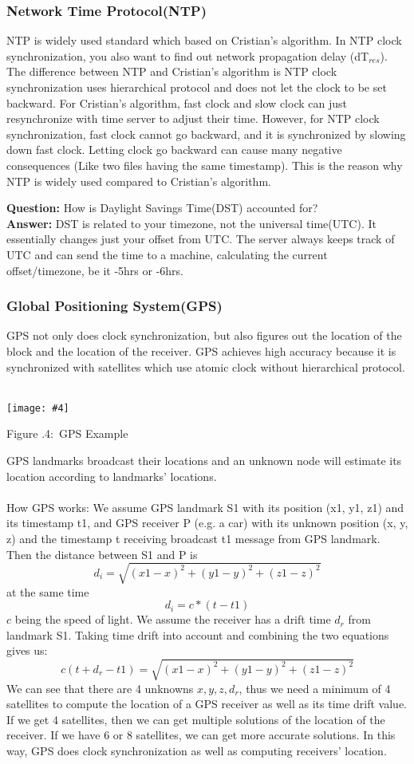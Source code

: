 \documentclass[twoside]{article}
\newcounter{lecnum}
\newcommand{\fig}[4]{
            \centerline{\texttt{[image: \#4]}}
            \begin{center}
            Figure \thelecnum.#1:~#3
            \end{center}
    }
\begin{document}
\subsubsection{Network Time Protocol(NTP)}
NTP is widely used standard which based on Cristian’s algorithm. In NTP clock synchronization, you also want to find out network propagation delay (dT$_{res}$). The difference between NTP and Cristian’s algorithm is NTP clock synchronization uses hierarchical protocol and does not let the clock to be set backward. For Cristian’s algorithm, fast clock and slow clock can just resynchronize with time server to adjust their time. However, for NTP clock synchronization, fast clock cannot go backward, and it is synchronized by slowing down fast clock. Letting clock go backward can cause many negative consequences (Like two files having the same timestamp). This is the reason why NTP is widely used compared to Cristian’s algorithm.

\textbf{Question:} How is Daylight Savings Time(DST) accounted for?\\
\textbf{Answer:} DST is related to your timezone, not the universal time(UTC). It essentially changes just your offset from UTC. The server always keeps track of UTC and can send the time to a machine, calculating the current offset/timezone, be it -5hrs or -6hrs. 

\subsubsection{Global Positioning System(GPS)}
GPS not only does clock synchronization, but also figures out the location of the block and the location of the receiver. GPS achieves high accuracy because it is synchronized with satellites which use atomic clock without hierarchical protocol.  \\\\
\fig{4}{0.4}{GPS Example}{../Pictures/gps.png}
GPS landmarks broadcast their locations and an unknown node will estimate its location according to landmarks’ locations.\\\\
How GPS works: We assume GPS landmark S1 with its position (x1, y1, z1) and its timestamp t1, and GPS receiver P (e.g. a car) with its unknown position (x, y, z) and the timestamp t receiving broadcast t1 message from GPS landmark.\\
Then the distance between S1 and P is $$d_{i} = \sqrt{(x1 - x)^2 + (y1 - y)^2 + (z1 - z)^2}$$at the same time $$d_{i} = c * (t-t1)$$ $c$ being the speed of light. We assume the receiver has a drift time $d_r$ from landmark S1. Taking time drift into account and combining the two equations gives us: $$c(t + d_r - t1) = \sqrt{(x1 - x)^2 + (y1 - y)^2 + (z1 - z)^2}$$
We can see that there are 4 unknowns $x, y, z, d_r$, thus we need a minimum of 4 satellites to compute the location of a GPS receiver as well as its time drift value. If we get 4 satellites, then we can get multiple solutions of the location of the receiver. If we have 6 or 8 satellites, we can get more accurate solutions. In this way, GPS does clock synchronization as well as computing receivers’ location.\\\\
\end{document}
